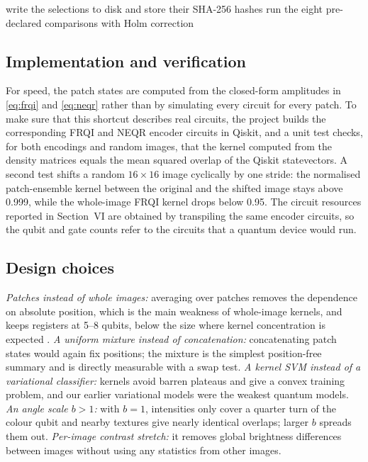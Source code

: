 \documentclass[12pt,onecolumn,draftclsnofoot]{IEEEtran}
\begin{document}
\begin{algorithm}[!t]
\caption{Leakage-controlled selection and evaluation}
\label{alg:protocol}
write the selections to disk and store their SHA-256 hashes\;
run the eight pre-declared comparisons with Holm correction\;
\end{algorithm}

\subsection{Implementation and verification}
For speed, the patch states are computed from the closed-form amplitudes in \eqref{eq:frqi} and \eqref{eq:neqr} rather than by simulating every circuit for every patch. To make sure that this shortcut describes real circuits, the project builds the corresponding FRQI and NEQR encoder circuits in Qiskit, and a unit test checks, for both encodings and random images, that the kernel computed from the density matrices equals the mean squared overlap of the Qiskit statevectors. A second test shifts a random $16\times16$ image cyclically by one stride: the normalised patch-ensemble kernel between the original and the shifted image stays above 0.999, while the whole-image FRQI kernel drops below 0.95. The circuit resources reported in Section~VI are obtained by transpiling the same encoder circuits, so the qubit and gate counts refer to the circuits that a quantum device would run.

\subsection{Design choices}
\emph{Patches instead of whole images:} averaging over patches removes the dependence on absolute position, which is the main weakness of whole-image kernels, and keeps registers at 5--8 qubits, below the size where kernel concentration is expected \cite{thanasilp2024}. \emph{A uniform mixture instead of concatenation:} concatenating patch states would again fix positions; the mixture is the simplest position-free summary and is directly measurable with a swap test. \emph{A kernel SVM instead of a variational classifier:} kernels avoid barren plateaus \cite{mcclean2018barren} and give a convex training problem, and our earlier variational models were the weakest quantum models. \emph{An angle scale $b>1$:} with $b=1$, intensities only cover a quarter turn of the colour qubit and nearby textures give nearly identical overlaps; larger $b$ spreads them out. \emph{Per-image contrast stretch:} it removes global brightness differences between images without using any statistics from other images.
\end{document}
